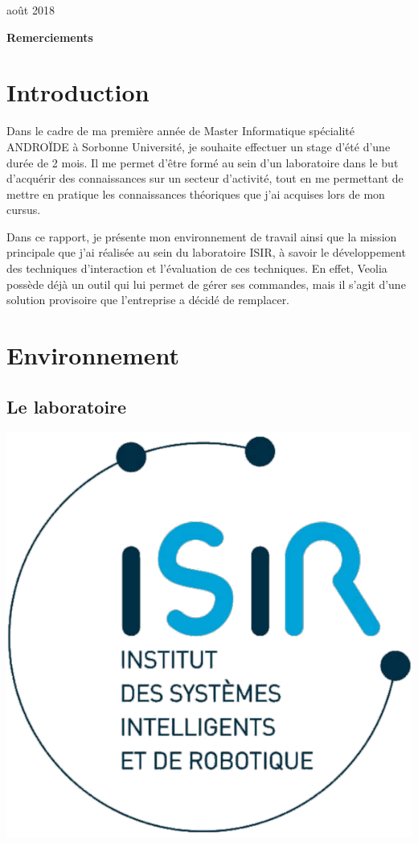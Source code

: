\documentclass[12pt,a4paper]{article}
\begin{document}
\begin{titlepage}
	{\large août 2018\par}
\end{titlepage}
{\huge \textbf{Remerciements}}
\newpage
\tableofcontents
\newpage
\section{Introduction}
Dans le cadre de ma première année de Master Informatique spécialité ANDROÏDE à Sorbonne Université, je souhaite effectuer un stage d'été d'une durée de 2 mois. Il me permet d'être formé au sein d'un laboratoire dans le but d'acquérir des connaissances sur un secteur d'activité, tout en me permettant de mettre en pratique les connaissances théoriques que j'ai acquises lors de mon cursus.

Dans ce rapport, je présente mon environnement de travail ainsi que la mission principale que j'ai réalisée au sein du laboratoire ISIR, à savoir le développement des techniques d'interaction et l'évaluation de ces techniques. En effet, Veolia possède déjà un outil qui lui permet de gérer
ses commandes, mais il s’agit d’une solution provisoire que l’entreprise a décidé de remplacer.
\section{Environnement}
\subsection{Le laboratoire}
\begin{center}
	\includegraphics[width=.3\linewidth]{ISIR.png}
\end{center}
\end{document}
